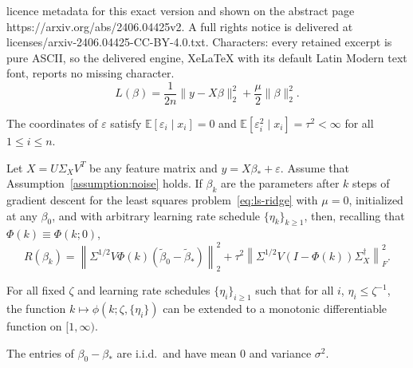 \documentclass[10pt,a4paper]{amsart}
\begin{document}
licence metadata for this exact version and shown on the abstract page https://arxiv.org/abs/2406.04425v2. A full rights notice is delivered at licenses/arxiv-2406.04425-CC-BY-4.0.txt. Characters: every retained excerpt is pure ASCII, so the delivered engine, XeLaTeX with its default Latin Modern text font, reports no missing character.
\begin{equation} \label{eq:ls-ridge}
    L(\beta) = \frac{1}{2n}\|y - X\beta\|_2^2 + \frac{\mu}{2}\|\beta\|^2_2.
\end{equation}

\begin{assumption} \label{assumption:noise}
    The coordinates of $\varepsilon$ satisfy $\mathbb{E}[\varepsilon_i \mid x_i] = 0$ and $\mathbb{E}[\varepsilon_i^2 \mid x_i] = \tau^2 < \infty$ for all $1 \leq i \leq n$.
\end{assumption}

\begin{corollary} \label{cor:gen-risk-betak}
Let $X = U \Sigma_X V^T$ be any feature matrix and $y = X \beta_* + \varepsilon$. Assume that Assumption~\ref{assumption:noise} holds. If $\beta_k$ are the parameters after $k$ steps of gradient descent for the least squares problem~\eqref{eq:ls-ridge} with $\mu = 0$, initialized at any $\beta_0$, and with arbitrary learning rate schedule $\{ \eta_k\}_{k \geq 1}$, then, recalling that $\Phi(k) \equiv \Phi(k; 0)$,
\[
    R(\beta_k) = \left\|\Sigma^{1/2}V\Phi(k)(\tilde{\beta}_0 - \tilde{\beta}_*)\right\|_2^2 + \tau^2\left\|\Sigma^{1/2}V(I - \Phi(k))\Sigma_X^\dagger \right\|_F^2.
\]
\end{corollary}

\begin{assumption} \label{assumption:differentiable-extension}
For all fixed $\zeta$ and learning rate schedules $\{\eta_i\}_{i \geq 1}$ such that for all $i$, $\eta_i \le \zeta^{-1}$, the function $k \mapsto \phi(k; \zeta, \{\eta_i\})$ can be extended to a monotonic differentiable function on $[1, \infty)$.
\end{assumption}

\begin{assumption} \label{assumption:spherical}
    The entries of $\beta_0 - \beta_*$ are i.i.d.\ and have mean 0 and variance $\sigma^2$.
\end{assumption}
\end{document}
